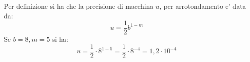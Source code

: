 Per definizione si ha che la precisione di macchina \(u\), per arrotondamento e' data da:
\[
u=\frac{1}{2} b ^{1-m}
\]
Se \(b=8, m=5\) si ha:
\[ 
u = \frac{1}{2}\cdot 8^{1-5} = \frac{1}{2}\cdot 8^{-4} = 1,2 \cdot 10^{-4} 
\]
